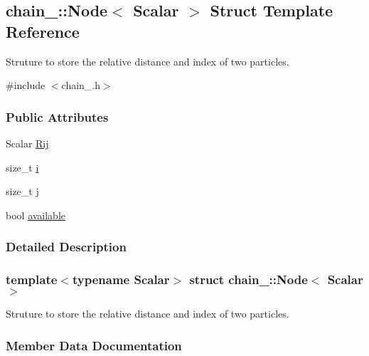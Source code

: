 \hypertarget{structchain_1_1_node}{}\subsection{chain_\+:\+:Node$<$ Scalar $>$ Struct Template Reference}
\label{structchain_1_1_node}


Struture to store the relative distance and index of two particles.  




{\ttfamily \#include $<$chain_.\+h$>$}

\subsubsection*{Public Attributes}
\begin{DoxyCompactItemize}
\item 
Scalar \mbox{\hyperlink{structchain_1_1_node_a3a9ca49370eba9c8ce1d6b2a146c93ee}{Rij}}
\item 
size\+\_\+t \mbox{\hyperlink{structchain_1_1_node_a289ef3bad054158a446e53481c2a9d17}{i}}
\item 
size\+\_\+t \mbox{\hyperlink{structchain_1_1_node_aa41c0c59d6cdd4263a72b9e5284aa3d9}{j}}
\item 
bool \mbox{\hyperlink{structchain_1_1_node_ac06192f15a8dba90e35c508b17aa0e63}{available}}
\end{DoxyCompactItemize}


\subsubsection{Detailed Description}
\subsubsection*{template$<$typename Scalar$>$\newline
struct chain_\+::\+Node$<$ Scalar $>$}

Struture to store the relative distance and index of two particles. 

\subsubsection{Member Data Documentation}
\mbox{\label{structchain_1_1_node_ac06192f15a8dba90e35c508b17aa0e63}} 
